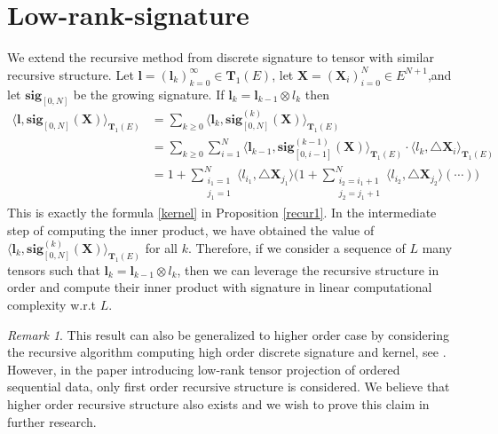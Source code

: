 \documentclass[12pt]{report}
\theoremstyle{definition}
\theoremstyle{remark}
\newtheorem*{remark}{Remark}
\begin{document}
\section{Low-rank-signature}
We extend the recursive method from discrete signature to tensor with similar recursive structure. Let $\mathbf{l} = (\mathbf{l}_{k})_{k=0}^{\infty} \in \mathbf{T}_{1}(E)$, let $\mathbf{X} = (\mathbf{X}_{i})_{i=0}^{N} \in E^{N+1}$,and let $\mathbf{sig}_{[0,N]}$ be the growing signature. If $\mathbf{l}_{k} = \mathbf{l}_{k-1}\otimes l_{k}$ then
  \begin{equation}
    \begin{split}
     \langle \mathbf{l}, \mathbf{sig}_{[0,N]}(\mathbf{X}) \rangle_{\mathbf{T}_{1}(E)} &= \sum_{k\geq 0}\langle \mathbf{l}_{k} , \mathbf{sig}^{(k)}_{[0,N]}(\mathbf{X}) \rangle_{\mathbf{T}_{1}(E)} \\
     &= \sum_{k\geq 0}\sum_{i=1}^{N} \langle \mathbf{l}_{k-1} ,\mathbf{sig}^{(k-1)}_{[0,i-1]}(\mathbf{X})\rangle_{\mathbf{T}_{1}(E)}\cdot\langle l_{k},\triangle \mathbf{X}_{i}\rangle_{\mathbf{T}_{1}(E)} \\
     &= 1 + \sum_{\substack{i_{1}=1 \\ j_{1} = 1}}^{N}\langle l_{i_{1}},  \triangle \mathbf{X}_{j_{1}} \rangle\Big(1 + \sum_{\substack{i_{2}=i_{1}+1 \\ j_{2} = j_{1}+1}}^{N}\langle l_{i_{2}},  \triangle \mathbf{X}_{j_{2}} \rangle(\cdots)\Big)
    \end{split}
  \end{equation}
  This is exactly the formula \eqref{kernel} in Proposition \ref{recur1}. In the intermediate step of computing the inner product, we have obtained the value of $\langle \mathbf{l}_{k} , \mathbf{sig}^{(k)}_{[0,N]}(\mathbf{X}) \rangle_{\mathbf{T}_{1}(E)}$ for all $k$. Therefore, if we consider a sequence of $L$ many tensors such that $\mathbf{l}_{k} = \mathbf{l}_{k-1}\otimes l_{k}$, then we can leverage the recursive structure in order and compute their inner product with signature in linear computational complexity w.r.t $L$.
  \begin{remark}
    This result can also be generalized to higher order case by considering the recursive algorithm computing high order discrete signature and kernel, see \cite{kiraly2019kernels}. However, in the paper \cite{toth2020seq2tens} introducing low-rank tensor projection of ordered sequential data, only first order recursive structure is considered. We believe that higher order recursive structure also exists and we wish to prove this claim in further research. 
  \end{remark} 
  
\end{document}
